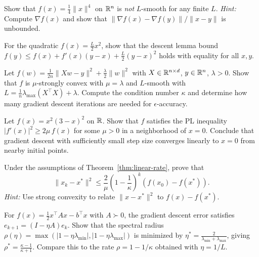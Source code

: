 \documentclass[11pt,a4paper]{article}
\begin{document}
\begin{exercise}\label{ex:smooth-verify}
Show that $f(x) = \frac{1}{4}\|x\|^4$ on $\mathbb{R}^n$ is \emph{not} $L$-smooth
for any finite $L$. \emph{Hint:} Compute $\nabla f(x)$ and show that
$\|\nabla f(x) - \nabla f(y)\|/\|x - y\|$ is unbounded.
\end{exercise}

\begin{exercise}\label{ex:descent-tight}
For the quadratic $f(x) = \frac{L}{2}x^2$, show that the descent lemma
bound $f(y) \le f(x) + f'(x)(y-x) + \frac{L}{2}(y-x)^2$ holds with
equality for all $x, y$.
\end{exercise}

\begin{exercise}\label{ex:ridge}
Let $f(w) = \frac{1}{2n}\|Xw - y\|^2 + \frac{\lambda}{2}\|w\|^2$ with
$X \in \mathbb{R}^{n \times d}$, $y \in \mathbb{R}^n$, $\lambda > 0$. Show that $f$
is $\mu$-strongly convex with $\mu = \lambda$ and $L$-smooth with
$L = \frac{1}{n}\lambda_{\max}(X^\top X) + \lambda$. Compute the
condition number $\kappa$ and determine how many gradient descent
iterations are needed for $\epsilon$-accuracy.
\end{exercise}

\begin{exercise}\label{ex:pl-nonconvex}
Let $f(x) = x^2(3 - x)^2$ on $\mathbb{R}$. Show that $f$ satisfies the PL
inequality $|f'(x)|^2 \ge 2\mu\, f(x)$ for some $\mu > 0$ in a
neighborhood of $x = 0$. Conclude that gradient descent with sufficiently
small step size converges linearly to $x = 0$ from nearby initial points.
\end{exercise}

\begin{exercise}\label{ex:iterate-convergence}
Under the assumptions of Theorem~\ref{thm:linear-rate}, prove that
\begin{equation}
  \|x_k - x^*\|^2 \le \frac{2}{\mu}\left(1 - \frac{1}{\kappa}\right)^k
  (f(x_0) - f(x^*)).
\end{equation}
\emph{Hint:} Use strong convexity to relate $\|x - x^*\|^2$ to
$f(x) - f(x^*)$.
\end{exercise}

\begin{exercise}\label{ex:optimal-step}
For $f(x) = \frac{1}{2}x^\top A x - b^\top x$ with $A \succ 0$,
the gradient descent error satisfies $e_{k+1} = (I - \eta A)e_k$.
Show that the spectral radius $\rho(\eta) = \max(|1 - \eta\lambda_{\min}|,
|1 - \eta\lambda_{\max}|)$ is minimized by
$\eta^* = \frac{2}{\lambda_{\min} + \lambda_{\max}}$,
giving $\rho^* = \frac{\kappa - 1}{\kappa + 1}$. Compare this to the
rate $\rho = 1 - 1/\kappa$ obtained with $\eta = 1/L$.
\end{exercise}
\end{document}
